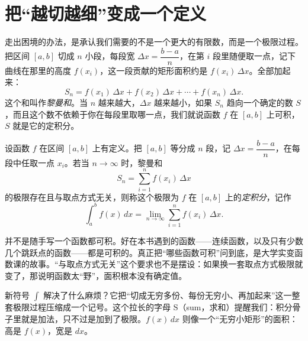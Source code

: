 \section{把“越切越细”变成一个定义}

走出困境的办法，是承认我们需要的不是一个更大的有限数，而是一个极限过程。把区间 $[a,b]$ 切成 $n$ 小段，每段宽 $\Delta x=\dfrac{b-a}{n}$，在第 $i$ 段里随便取一点，记下曲线在那里的高度 $f(x_i)$，这一段贡献的矩形面积约是 $f(x_i)\,\Delta x$。全部加起来：
\[
S_n=f(x_1)\,\Delta x+f(x_2)\,\Delta x+\cdots+f(x_n)\,\Delta x .
\]
这个和叫作\emph{黎曼和}。当 $n$ 越来越大，$\Delta x$ 越来越小，如果 $S_n$ 趋向一个确定的数 $S$，而且这个数不依赖于你在每段里取哪一点，我们就说函数 $f$ 在 $[a,b]$ 上可积，$S$ 就是它的定积分。

\begin{dingyi}[定积分]
设函数 $f$ 在区间 $[a,b]$ 上有定义。把 $[a,b]$ 等分成 $n$ 段，记 $\Delta x=\dfrac{b-a}{n}$，在每段中任取一点 $x_i$。若当 $n\to\infty$ 时，黎曼和
\[
S_n=\sum_{i=1}^{n} f(x_i)\,\Delta x
\]
的极限存在且与取点方式无关，则称这个极限为 $f$ 在 $[a,b]$ 上的\emph{定积分}，记作
\[
\int_a^b f(x)\,dx=\lim_{n\to\infty}\sum_{i=1}^{n} f(x_i)\,\Delta x .
\]
\end{dingyi}

\begin{zhu}
并不是随手写一个函数都可积。好在本书遇到的函数——连续函数，以及只有少数几个跳跃点的函数——都是可积的。真正把“哪些函数可积”问到底，是大学实变函数课的故事。“与取点方式无关”这个要求也不是摆设：如果换一套取点方式极限就变了，那说明函数太“野”，面积根本没有确定值。
\end{zhu}

\begin{center}
\end{center}

新符号 $\int$ 解决了什么麻烦？它把“切成无穷多份、每份无穷小、再加起来”这一整套极限过程压缩成一个记号。这个拉长的字母 S（sum，求和）提醒我们：积分骨子里就是加法，只不过是加到了极限。$f(x)\,dx$ 则像一个“无穷小矩形”的面积：高是 $f(x)$，宽是 $dx$。

